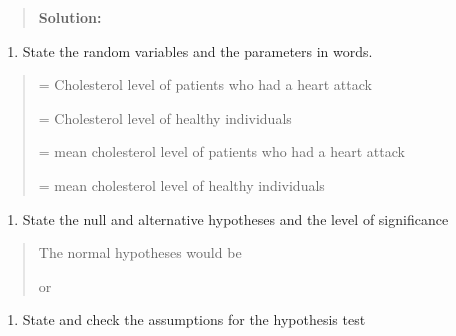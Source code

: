 \documentclass[]{book}
\providecommand{\tightlist}{%
  \setlength{\itemsep}{0pt}\setlength{\parskip}{0pt}}
\begin{document}
\begin{quote}
\textbf{Solution:}
\end{quote}

\begin{enumerate}
\def\labelenumi{\arabic{enumi}.}
\tightlist
\item
  State the random variables and the parameters in words.
\end{enumerate}

\begin{quote}
= Cholesterol level of patients who had a heart attack

= Cholesterol level of healthy individuals

= mean cholesterol level of patients who had a heart attack

= mean cholesterol level of healthy individuals
\end{quote}

\begin{enumerate}
\def\labelenumi{\arabic{enumi}.}
\setcounter{enumi}{1}
\tightlist
\item
  State the null and alternative hypotheses and the level of significance
\end{enumerate}

\begin{quote}
The normal hypotheses would be

or
\end{quote}

\begin{enumerate}
\def\labelenumi{\arabic{enumi}.}
\setcounter{enumi}{2}
\tightlist
\item
  State and check the assumptions for the hypothesis test
\end{enumerate}
\end{document}
